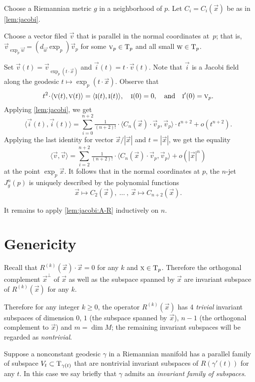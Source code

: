 \documentclass[a4paper,10pt]{article}
\begin{document}
Choose a Riemannian metric $g$ in a neighborhood of $p$.
Let $C_i=C_i(\vec{x})$ be as in \ref{lem:jacobi}.

Choose a vector filed $\vec{v}$ that is parallel in the normal coordinates at~$p$;
that is, $\vec{v}_{\exp_p\vec{w}}=(d_\vec{w}\exp_p)\vec{v}_p$ for some $\text{\sc{v}}_p\in\mathrm{T}_p$ and all small $\text{\sc{w}}\in \mathrm{T}_p$.

Set $\vec{v}(t)=\vec{v}_{\exp_p(t\cdot \vec{x})}$ and $\vec{i}(t)=t\cdot \vec{v}(t)$.
Note that $\vec{i}$ is a Jacobi field along the geodesic $t\mapsto \exp_p(t\cdot \vec{x})$.
Observe that 
\[t^2\cdot \langle \vec{v}(t),
\vec{v}(t)\rangle=\langle \vec{i}(t), \vec{i}(t)\rangle,
\quad 
\vec{i}(0)=0,
\quad 
\text{and} \quad 
\vec{i}'(0)\z=\vec{v}_p.\]
Applying \ref{lem:jacobi}, we get
\[\langle\vec{i}(t), \vec{i}(t)\rangle=\sum_{i=0}^{n+2}\tfrac1{(n+2)!}\cdot\langle C_n(\vec{x})\cdot \vec{v}_p,\vec{v}_p\rangle\cdot t^{n+2}+o(t^{n+2}).\]
Applying the last identity for vector $\vec{x}/|\vec{x}|$ and $t=|\vec{x}|$, we get the equality
\[\langle\vec{v}, \vec{v}\rangle=\sum_{i=2}^{n+2}\tfrac1{(n+2)!}\cdot\langle C_n(\vec{x})\cdot \vec{v}_p,\vec{v}_p\rangle+o(|\vec{x}|^{n})\]
at the point $\exp_p \vec{x}$.
It follows that in the normal coordinates at $p$,
the $n$-jet $J^n_g(p)$ is uniquely described by the polynomial functions
\[\vec{x}\mapsto C_2(\vec{x}),
\ \dots\ ,\ 
\vec{x}\mapsto C_{n+2}(\vec{x}).\]

It remains to apply \ref{lem:jacobi:A-R} inductively on $n$.
\qeds 

\section{Genericity }

Recall that $R^{(k)}(\vec{x})\cdot \vec{x}=0$
for any $k$ and $\text{\sc{x}}\in \mathrm{T}_p$.
Therefore the orthogonal complement $\vec{x}^{\perp}$ of $\vec{x}$ as well as the subspace spanned by $\vec{x}$ are invariant subspace of $R^{(k)}(\vec{x})$ for any $k$.

Therefore for any integer $k\ge 0$,
the operator $R^{(k)}(\vec{x})$ has 4 \emph{trivial} invariant subspaces of dimension $0$, $1$ (the subspace spanned by $\vec{x}$), $n-1$ (the orthogonal complement to $\vec{x}$) and $m=\dim M$;
the remaining invariant subspaces will be regarded as \emph{nontrivial}.

Suppose a nonconstant geodesic $\gamma$ in a Riemannian manifold has a parallel family of subspace $V_t \subset \mathrm{T}_{\gamma (t)}$ that are nontrivial invariant subspaces of $R(\gamma'(t))$ for any $t$.
In this case we say briefly that $\gamma$ admits an \emph{invariant family of subspaces}.
\end{document}
